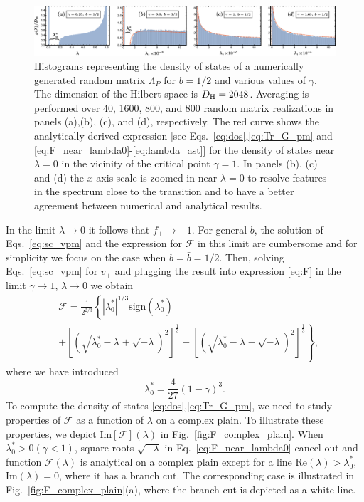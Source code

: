 \documentclass[%
 reprint,
 superscriptaddress,
 amsmath,amssymb,
prx,
]{revtex4-2}\href{\href{}{}}{}
\begin{document}
\begin{figure}
	\includegraphics[width = 2.05\columnwidth]{lam_W_distr_b12_gap.png}
\caption{Histograms representing the density of states of a numerically generated random matrix $\Lambda_P$ for $b=1/2$ and various values of $\gamma$. The dimension of the Hilbert space is $D_{\rm H}=2048$. Averaging is performed over 40, 1600, 800, and 800 random matrix realizations in panels (a),(b), (c), and (d), respectively. The red curve shows the analytically derived expression [see Eqs.~\eqref{eq:dos},\eqref{eq:Tr_G_pm} and \eqref{eq:F_near_lambda0}-\eqref{eq:lambda_ast}] for the density of states near $\lambda=0$ in the vicinity of the critical point $\gamma=1$. In panels (b), (c) and (d) the $x$-axis scale is zoomed in near $\lambda=0$ to resolve features in the spectrum close to the transition and to have a better agreement between numerical and analytical results.
	}
	\label{fig:W_eval_hist_eval0_1}
\end{figure}

In the limit $\lambda\to 0$ it follows that $f_{\pm}\to -1$.
For general $b$, the solution of Eqs.~\eqref{eq:sc_vpm} and the expression for $\mathcal{F}$ in this limit are cumbersome and for simplicity we focus on the case when $b=\bar b=1/2$.
Then, solving Eqs.~\eqref{eq:sc_vpm} for $v_{\pm}$ and plugging the result into expression \eqref{eq:F} in the limit $\gamma\to 1$, $\lambda\to0$ we obtain
\begin{align}
    &\mathcal{F} = \frac{1}{2^{2/3}}\left\{\left|\lambda_0^{\ast}\right|^{1/3}\text{sign}\left(\lambda_0^{\ast}\right) \right. \nonumber\\
    &\left.+\left[\left(\sqrt{\lambda_0^{\ast}-\lambda}+\sqrt{-\lambda}\right)^{2}\right]^{\frac{1}{3}}+\left[\left(\sqrt{\lambda_0^{\ast}-\lambda}-\sqrt{-\lambda}\right)^{2}\right]^{\frac{1}{3}} \right\},\label{eq:F_near_lambda0}
\end{align}
where we have introduced 
\begin{equation}
    \lambda_0^{\ast} = \frac{4}{27}(1-\gamma)^3.
    \label{eq:lambda_ast}
\end{equation}
To compute the density of states \eqref{eq:dos},\eqref{eq:Tr_G_pm}, we need to study properties of $\mathcal{F}$ as a function of $\lambda$ on a complex plain.
To illustrate these properties, we depict $\text{Im}[\mathcal{F}](\lambda)$ in Fig.~\ref{fig:F_complex_plain}.
When $ \lambda_0^{\ast}>0 (\gamma<1)$, square roots $\sqrt{-\lambda}$ in Eq.~\eqref{eq:F_near_lambda0} cancel out and function $\mathcal{F}(\lambda)$ is analytical on a complex plain except for a line $\text{Re}(\lambda)> \lambda_0^{\ast}$, $\text{Im}(\lambda)=0$, where it has a branch cut.
The corresponding case is illustrated in Fig.~\ref{fig:F_complex_plain}(a), where the branch cut is depicted as a white line.
\end{document}
